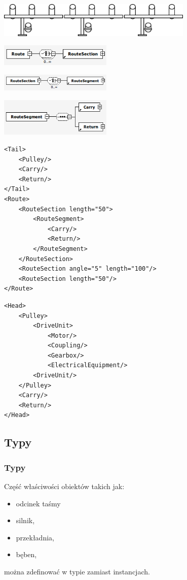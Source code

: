 \documentclass{beamer}
\begin{document}
\begin{frame}
\begin{center}
\includegraphics[width=0.7\textwidth]{png/odcinek_trasy}

\pause

\includegraphics[width=0.4\textwidth]{png/trasa_xsd}

\pause

\includegraphics[width=0.4\textwidth]{png/odcinek_trasy_xsd}

\pause

\includegraphics[width=0.4\textwidth]{png/segment_trasy_xsd}
\end{center}
\end{frame}

\begin{frame}[fragile]
\begin{verbatim}
<Tail>
    <Pulley/>
    <Carry/>
    <Return/>
</Tail>
<Route>
    <RouteSection length="50">
        <RouteSegment>
            <Carry/>
            <Return/>
        </RouteSegment>
    </RouteSection>
    <RouteSection angle="5" length="100"/>
    <RouteSection length="50"/>
</Route>
\end{verbatim}
\end{frame}

\begin{frame}[fragile]
\begin{verbatim}
<Head>
    <Pulley>
        <DriveUnit>
            <Motor/>
            <Coupling/>
            <Gearbox/>
            <ElectricalEquipment/>
        <DriveUnit/>
    </Pulley>
    <Carry/>
    <Return/>
</Head>
\end{verbatim}
\end{frame}

\subsection{Typy}
\begin{frame}
\frametitle{Typy}
Część właściwości obiektów takich jak:
\begin{itemize}
\item odcinek taśmy
\item silnik,
\item przekładnia,
\item bęben,
\end{itemize}
można zdefinować w typie zamiast instancjach.
\end{frame}
\end{document}
